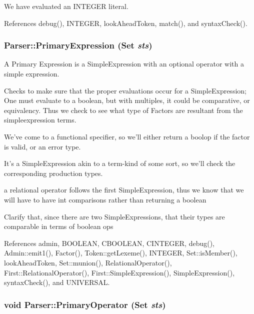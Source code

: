 We have evaluated an INTEGER literal. 



References debug(), INTEGER, lookAheadToken, match(), and syntaxCheck().

\hypertarget{classParser_a293b721a8e832a137e495a6a2178188e}{
\subsubsection[{PrimaryExpression}]{ Parser::PrimaryExpression ({\bf Set} {\em sts})}}
\label{classParser_a293b721a8e832a137e495a6a2178188e}


A Primary Expression is a SimpleExpression with an optional operator with a simple expression. 

Checks to make sure that the proper evaluations occur for a SimpleExpression; One must evaluate to a boolean, but with multiples, it could be comparative, or equivalency. Thus we check to see what type of Factors are resultant from the simpleexpression terms. 

We've come to a functional specifier, so we'll either return a boolop if the factor is valid, or an error type.

It's a SimpleExpression akin to a term-\/kind of some sort, so we'll check the corresponding production types.

a relational operator follows the first SimpleExpression, thus we know that we will have to have int comparisons rather than returning a boolean

Clarify that, since there are two SimpleExpressions, that their types are comparable in terms of boolean ops 



References admin, BOOLEAN, CBOOLEAN, CINTEGER, debug(), Admin::emit1(), Factor(), Token::getLexeme(), INTEGER, Set::isMember(), lookAheadToken, Set::munion(), RelationalOperator(), First::RelationalOperator(), First::SimpleExpression(), SimpleExpression(), syntaxCheck(), and UNIVERSAL.

\hypertarget{classParser_a7ac200c2e0ac927e115027fb593ac72d}{
\subsubsection[{PrimaryOperator}]{\setlength{\rightskip}{0pt plus 5cm}void Parser::PrimaryOperator ({\bf Set} {\em sts})}}
\label{classParser_a7ac200c2e0ac927e115027fb593ac72d}



